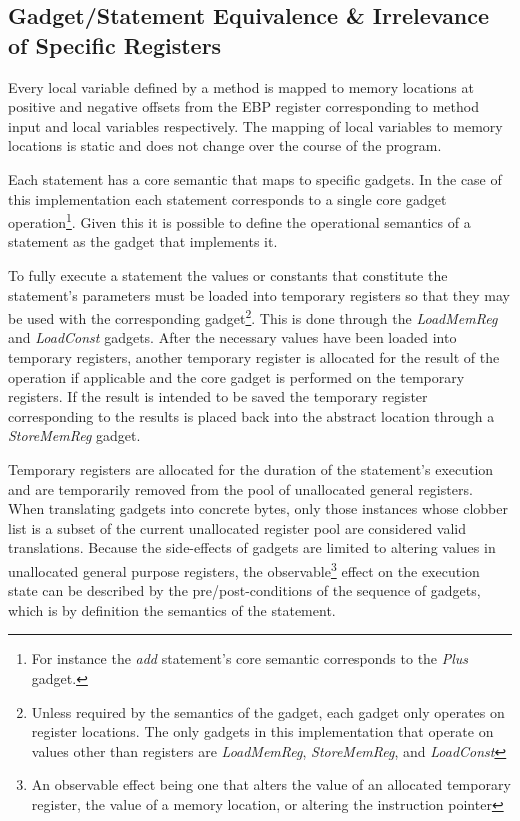     \subsection{Gadget/Statement Equivalence \& Irrelevance of Specific Registers}

        Every local variable defined by a method is mapped to memory
        locations at positive and negative offsets from the EBP register
        corresponding to method input and local variables respectively. The
        mapping of local variables to memory locations is static and does
        not change over the course of the program.

        Each statement has a core semantic that maps to specific gadgets. In
        the case of this implementation each statement corresponds to a
        single core gadget operation\footnote{For instance the \emph{add}
        statement's core semantic corresponds to the \emph{Plus} gadget.}.
        Given this it is possible to define the operational semantics of a
        statement as the gadget that implements it.

        To fully execute a statement the values or constants that constitute
        the statement's parameters must be loaded into temporary registers so
        that they may be used with the corresponding gadget\footnote{Unless
        required by the semantics of the gadget, each gadget only operates
        on register locations. The only gadgets in this implementation that
        operate on values other than registers are \emph{LoadMemReg},
        \emph{StoreMemReg}, and \emph{LoadConst}}.  This is done through the
        \emph{LoadMemReg} and \emph{LoadConst} gadgets.  After the necessary
        values have been loaded into temporary registers, another temporary
        register is allocated for the result of the operation if applicable
        and the core gadget is performed on the temporary registers.  If the
        result is intended to be saved the temporary register corresponding
        to the results is placed back into the abstract location through a
        \emph{StoreMemReg} gadget.
        
        Temporary registers are allocated for the duration of the
        statement's execution and are temporarily removed from the pool of
        unallocated general registers. When translating gadgets into
        concrete bytes, only those instances whose clobber list is a subset
        of the current unallocated register pool are considered valid
        translations. Because the side-effects of gadgets are limited to
        altering values in unallocated general purpose registers, the
        observable\footnote{An observable effect being one that alters the
        value of an allocated temporary register, the value of a memory
        location, or altering the instruction pointer} effect on the
        execution state can be described by the pre/post-conditions of the
        sequence of gadgets, which is by definition the semantics of the
        statement.
    
